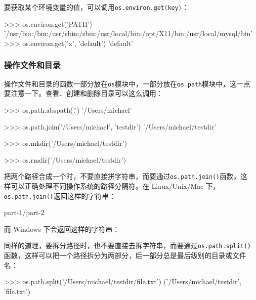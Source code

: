 要获取某个环境变量的值，可以调用\texttt{os.environ.get(\textquotesingle{}key\textquotesingle{})}：

\begin{pythoncode}
>>> os.environ.get('PATH')
'/usr/bin:/bin:/usr/sbin:/sbin:/usr/local/bin:/opt/X11/bin:/usr/local/mysql/bin'
>>> os.environ.get('x', 'default')
'default'
\end{pythoncode}

\hypertarget{ux64cdux4f5cux6587ux4ef6ux548cux76eeux5f55-1}{%
\subsubsection{操作文件和目录}\label{ux64cdux4f5cux6587ux4ef6ux548cux76eeux5f55-1}}

操作文件和目录的函数一部分放在\texttt{os}模块中，一部分放在\texttt{os.path}模块中，这一点要注意一下。查看、创建和删除目录可以这么调用：

\begin{pythoncode}
>>> os.path.abspath('.')
'/Users/michael'

>>> os.path.join('/Users/michael', 'testdir')
'/Users/michael/testdir'

>>> os.mkdir('/Users/michael/testdir')

>>> os.rmdir('/Users/michael/testdir')
\end{pythoncode}

把两个路径合成一个时，不要直接拼字符串，而要通过\texttt{os.path.join()}函数，这样可以正确处理不同操作系统的路径分隔符。在
Linux/Unix/Mac 下，\texttt{os.path.join()}返回这样的字符串：

\begin{pythoncode}
part-1/part-2
\end{pythoncode}

而 Windows 下会返回这样的字符串：


同样的道理，要拆分路径时，也不要直接去拆字符串，而要通过\texttt{os.path.split()}函数，这样可以把一个路径拆分为两部分，后一部分总是最后级别的目录或文件名：

\begin{pythoncode}
>>> os.path.split('/Users/michael/testdir/file.txt')
('/Users/michael/testdir', 'file.txt')
\end{pythoncode}

